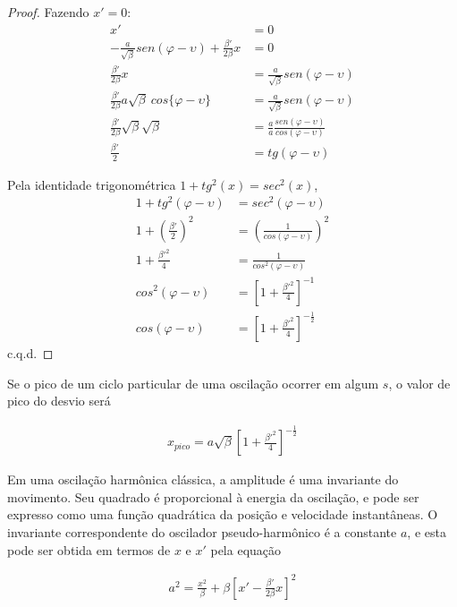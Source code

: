 \begin{proof}
	Fazendo $x'=0$:
	\begin{align*}
        x'&=0\\
        -\frac{a}{\sqrt{\beta}}sen(\varphi-\upsilon)+\frac{\beta'}{2\beta}x &= 0\\
        \frac{\beta'}{2\beta}x &= \frac{a}{\sqrt{\beta}}sen(\varphi-\upsilon)\\
        \frac{\beta'}{2\beta}a\sqrt{\beta}\ cos\{\varphi-\upsilon\} &= \frac{a}{\sqrt{\beta}}sen(\varphi-\upsilon)\\
        \frac{\beta'}{2\beta}\sqrt{\beta}\sqrt{\beta} &= \frac{a}{a}\frac{sen(\varphi-\upsilon)}{cos(\varphi-\upsilon)}\\
        \frac{\beta'}{2} &= tg(\varphi-\upsilon)
	\end{align*}
	
	Pela identidade trigonométrica $1+tg^2(x) = sec^2(x)$,
	\begin{align*}
        1+tg^2(\varphi-\upsilon) &= sec^2(\varphi-\upsilon)\\
        1+\left(\frac{\beta'}{2}\right)^2 &= \left(\frac{1}{cos(\varphi-\upsilon)}\right)^2\\
        1+\frac{\beta'^2}{4} &= \frac{1}{cos^2(\varphi-\upsilon)}\\
        cos^2(\varphi-\upsilon) &= \left[1+\frac{\beta'^2}{4}\right]^{-1}\\
        cos(\varphi-\upsilon) &= \left[1+\frac{\beta'^2}{4}\right]^{-\frac{1}{2}}
	\end{align*}
	c.q.d.
\end{proof}
	
Se o pico de um ciclo particular de uma oscilação ocorrer em algum $s$, o valor de pico do desvio será
	
\begin{align}
	x_{pico} = a\sqrt{\beta}\left[1+\frac{\beta'^2}{4}\right]^{-\frac{1}{2}}
\end{align}
	
Em uma oscilação harmônica clássica, a amplitude é uma invariante do movimento. Seu quadrado é proporcional à energia da oscilação, e pode ser expresso como uma função quadrática da posição e velocidade instantâneas. O invariante correspondente do oscilador pseudo-harmônico é a constante $a$, e esta pode ser obtida em termos de $x$ e $x'$ pela equação
	
\begin{align}
	a^2 = \frac{x^2}{\beta} + \beta\left[x'-\frac{\beta'}{2\beta}x\right]^2\label{eq:2.56}
\end{align}
	
